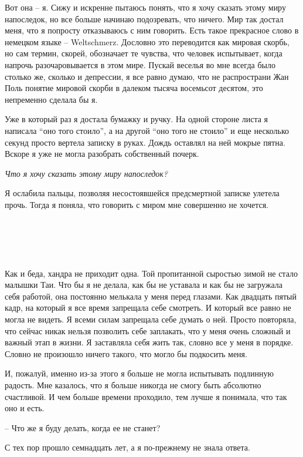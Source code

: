 \documentclass[
]{book}
\begin{document}
Вот она -- я. Сижу и искренне пытаюсь понять, что я хочу сказать этому миру напоследок, но все больше начинаю подозревать, что ничего. Мир так достал меня, что я попросту отказываюсь с ним говорить. Есть такое прекрасное слово в немецком языке -- Weltschmerz. Дословно это переводится как мировая скорбь, но сам термин, скорей, обозначает те чувства, что человек испытывает, когда напрочь разочаровывается в этом мире. Пускай веселья во мне всегда было столько же, сколько и депрессии, я все равно думаю, что не распространи Жан Поль понятие мировой скорби в далеком тысяча восемьсот десятом, это непременно сделала бы я.

Уже в который раз я достала бумажку и ручку. На одной стороне листа я написала ``оно того стоило'', а на другой ``оно того не стоило'' и еще несколько секунд просто вертела записку в руках. Дождь оставлял на ней мокрые пятна. Вскоре я уже не могла разобрать собственный почерк.

\emph{Что я хочу сказать этому миру напоследок?}

Я ослабила пальцы, позволяя несостоявшейся предсмертной записке улетела прочь. Тогда я поняла, что говорить с миром мне совершенно не хочется.

\hypertarget{chapter-92}{%
\chapter{~}\label{chapter-92}}

Как и беда, хандра не приходит одна. Той пропитанной сыростью зимой не стало малышки Таи. Что бы я не делала, как бы не уставала и как бы не загружала себя работой, она постоянно мелькала у меня перед глазами. Как двадцать пятый кадр, на который я все время запрещала себе смотреть. И который все равно не могла не видеть. Я всеми силам запрещала себе думать о ней. Просто повторяла, что сейчас никак нельзя позволить себе заплакать, что у меня очень сложный и важный этап в жизни. Я заставляла себя жить так, словно все у меня в порядке. Словно не произошло ничего такого, что могло бы подкосить меня.

И, пожалуй, именно из-за этого я больше не могла испытывать подлинную радость. Мне казалось, что я больше никогда не смогу быть абсолютно счастливой. И чем больше времени проходило, тем лучше я понимала, что так оно и есть.

-- Что же я буду делать, когда ее не станет?

С тех пор прошло семнадцать лет, а я по-прежнему не знала ответа.
\end{document}
